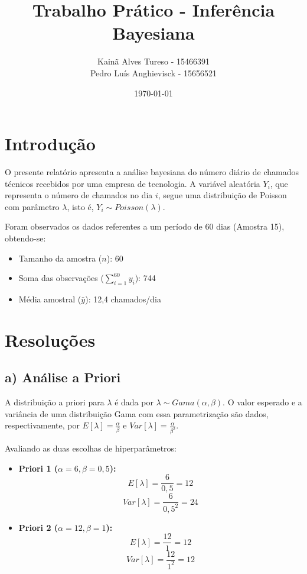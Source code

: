 \documentclass[brazil, a4paper, 12pt]{article}
\title{Trabalho Prático - Inferência Bayesiana}
\author{Kainã Alves Tureso - 15466391\\
        Pedro Luís Anghievisck - 15656521}
\date{\today}
\begin{document}
    \maketitle
    \tableofcontents
    \newpage

\section{Introdução}
O presente relatório apresenta a análise bayesiana do número diário de chamados técnicos recebidos por uma empresa de tecnologia. A variável aleatória $Y_i$, que representa o número de chamados no dia $i$, segue uma distribuição de Poisson com parâmetro $\lambda$, isto é, $Y_i \sim Poisson(\lambda)$.

Foram observados os dados referentes a um período de 60 dias (Amostra 15), obtendo-se:
\begin{itemize}
    \item Tamanho da amostra ($n$): 60
    \item Soma das observações ($\sum_{i=1}^{60} y_i$): 744
    \item Média amostral ($\bar{y}$): 12,4 chamados/dia
\end{itemize}

\section{Resoluções}

\subsection{a) Análise a Priori}
A distribuição a priori para $\lambda$ é dada por $\lambda \sim Gama(\alpha, \beta)$. O valor esperado e a variância de uma distribuição Gama com essa parametrização são dados, respectivamente, por $E[\lambda] = \frac{\alpha}{\beta}$ e $Var[\lambda] = \frac{\alpha}{\beta^2}$.

Avaliando as duas escolhas de hiperparâmetros:
\begin{itemize}
    \item \textbf{Priori 1 ($\alpha=6, \beta=0,5$):}
    $$E[\lambda] = \frac{6}{0,5} = 12$$
    $$Var[\lambda] = \frac{6}{0,5^2} = 24$$
    
    \item \textbf{Priori 2 ($\alpha=12, \beta=1$):}
    $$E[\lambda] = \frac{12}{1} = 12$$
    $$Var[\lambda] = \frac{12}{1^2} = 12$$
\end{itemize}
\end{document}
